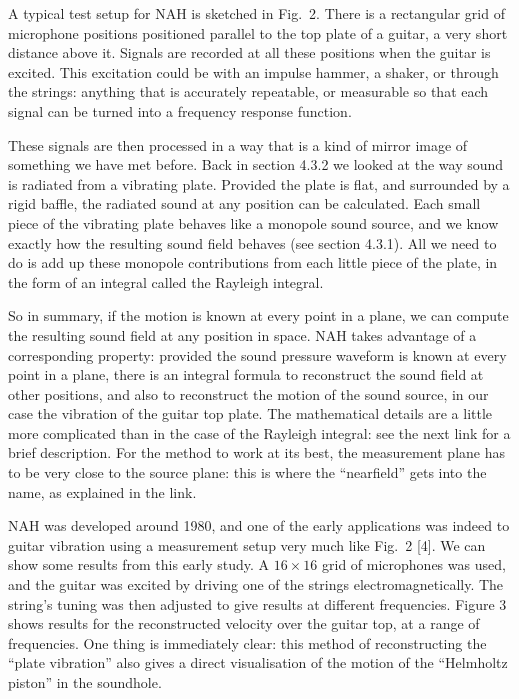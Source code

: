  A typical test setup for NAH is sketched in Fig.\ 2. There is a rectangular 
  grid of microphone positions positioned parallel to the top plate of a 
  guitar, a very short distance above it. Signals are recorded at all these 
  positions when the guitar is excited. This excitation could be with an 
  impulse hammer, a shaker, or through the strings: anything that is accurately 
  repeatable, or measurable so that each signal can be turned into a frequency 
  response function. 


  These signals are then processed in a way that is a kind of mirror image of 
  something we have met before. Back in section 4.3.2 we looked at the way 
  sound is radiated from a vibrating plate. Provided the plate is flat, and 
  surrounded by a rigid baffle, the radiated sound at any position can be 
  calculated. Each small piece of the vibrating plate behaves like a monopole 
  sound source, and we know exactly how the resulting sound field behaves (see 
  section 4.3.1). All we need to do is add up these monopole contributions from 
  each little piece of the plate, in the form of an integral called the 
  Rayleigh integral. 

  So in summary, if the motion is known at every point in a plane, we can 
  compute the resulting sound field at any position in space. NAH takes 
  advantage of a corresponding property: provided the sound pressure waveform 
  is known at every point in a plane, there is an integral formula to 
  reconstruct the sound field at other positions, and also to reconstruct the 
  motion of the sound source, in our case the vibration of the guitar top 
  plate. The mathematical details are a little more complicated than in the 
  case of the Rayleigh integral: see the next link for a brief description. For 
  the method to work at its best, the measurement plane has to be very close to 
  the source plane: this is where the “nearfield” gets into the name, as 
  explained in the link. 

  NAH was developed around 1980, and one of the early applications was indeed 
  to guitar vibration using a measurement setup very much like Fig.\ 2 [4]. We 
  can show some results from this early study. A $16 \times 16$ grid of 
  microphones was used, and the guitar was excited by driving one of the 
  strings electromagnetically. The string’s tuning was then adjusted to give 
  results at different frequencies. Figure 3 shows results for the 
  reconstructed velocity over the guitar top, at a range of frequencies. One 
  thing is immediately clear: this method of reconstructing the “plate 
  vibration” also gives a direct visualisation of the motion of the “Helmholtz 
  piston” in the soundhole. 

